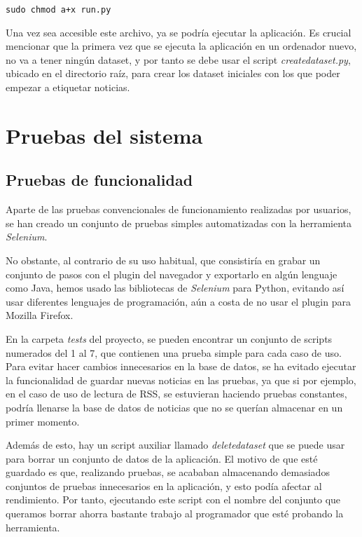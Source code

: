 \begin{verbatim}
sudo chmod a+x run.py
\end{verbatim}

Una vez sea accesible este archivo, ya se podría ejecutar la aplicación. Es crucial mencionar que la primera vez que se ejecuta la aplicación en un ordenador nuevo, no va a tener ningún dataset, y por tanto se debe usar el script \emph{createdataset.py}, ubicado en el directorio raíz, para crear los dataset iniciales con los que poder empezar a etiquetar noticias.


\section{Pruebas del sistema}

\subsection{Pruebas de funcionalidad}

Aparte de las pruebas convencionales de funcionamiento realizadas por usuarios, se han creado un conjunto de pruebas simples automatizadas con la herramienta \emph{Selenium}. 

No obstante, al contrario de su uso habitual, que consistiría en grabar un conjunto de pasos con el plugin del navegador y exportarlo en algún lenguaje como Java, hemos usado las bibliotecas de \emph{Selenium} para Python, evitando así usar diferentes lenguajes de programación, aún a costa de no usar el plugin para Mozilla Firefox.

En la carpeta \emph{tests} del proyecto, se pueden encontrar un conjunto de scripts numerados del 1 al 7, que contienen una prueba simple para cada caso de uso. Para evitar hacer cambios innecesarios en la base de datos, se ha evitado ejecutar la funcionalidad de guardar nuevas noticias en las pruebas, ya que si por ejemplo, en el caso de uso de lectura de RSS, se estuvieran haciendo pruebas constantes, podría llenarse la base de datos de noticias que no se querían almacenar en un primer momento.

Además de esto, hay un script auxiliar llamado \emph{deletedataset} que se puede usar para borrar un conjunto de datos de la aplicación. El motivo de que esté guardado es que, realizando pruebas, se acababan almacenando demasiados conjuntos de pruebas innecesarios en la aplicación, y esto podía afectar al rendimiento. Por tanto, ejecutando este script con el nombre del conjunto que queramos borrar ahorra bastante trabajo al programador que esté probando la herramienta.

